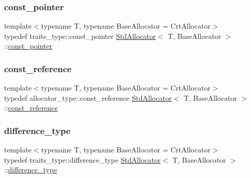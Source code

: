 \mbox{\label{classStdAllocator_add1391b3b872c9be9b4d89ed4fabe296}} 
\subsubsection{\texorpdfstring{const\+\_\+pointer}{const\_pointer}}
{\footnotesize\ttfamily template$<$typename T, typename Base\+Allocator = Crt\+Allocator$>$ \\
typedef traits\+\_\+type\+::const\+\_\+pointer \hyperlink{classStdAllocator}{Std\+Allocator}$<$ T, Base\+Allocator $>$\+::\hyperlink{classStdAllocator_add1391b3b872c9be9b4d89ed4fabe296}{const\+\_\+pointer}}

\mbox{\label{classStdAllocator_a2bc4a28386765e3a2c105b270793a49e}} 
\subsubsection{\texorpdfstring{const\+\_\+reference}{const\_reference}}
{\footnotesize\ttfamily template$<$typename T, typename Base\+Allocator = Crt\+Allocator$>$ \\
typedef allocator\+\_\+type\+::const\+\_\+reference \hyperlink{classStdAllocator}{Std\+Allocator}$<$ T, Base\+Allocator $>$\+::\hyperlink{classStdAllocator_a2bc4a28386765e3a2c105b270793a49e}{const\+\_\+reference}}

\mbox{\label{classStdAllocator_a4f3adbac47a8c20e47dbfb5c1f421ccd}} 
\subsubsection{\texorpdfstring{difference\+\_\+type}{difference\_type}}
{\footnotesize\ttfamily template$<$typename T, typename Base\+Allocator = Crt\+Allocator$>$ \\
typedef traits\+\_\+type\+::difference\+\_\+type \hyperlink{classStdAllocator}{Std\+Allocator}$<$ T, Base\+Allocator $>$\+::\hyperlink{classStdAllocator_a4f3adbac47a8c20e47dbfb5c1f421ccd}{difference\+\_\+type}}

